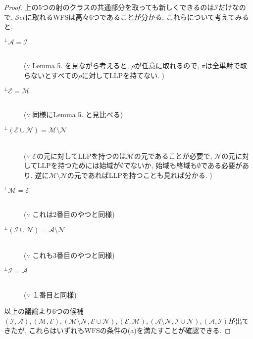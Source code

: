 \documentclass[. /main]{subfiles}
\theoremstyle{definition}
\begin{document}
\begin{proof}
上の5つの射のクラスの共通部分を取っても新しくできるのは$\mathcal{I}$だけなので, $\mathcal{S}et$に取れるWFSは高々6つであることが分かる. これらについて考えてみると, 
\begin{description}
\item [${}^{\perp}\mathcal{A}=\mathcal{I}$] \mbox{}\\
        ($\because$ Lemma 5. を見ながら考えると, $\rho$が任意に取れるので, $\pi$は全単射で取らないとすべての$\rho$に対してLLPを持てない. )
\item [${}^{\perp}\mathcal{E}=\mathcal{M}$]\mbox{}\\
        ($\because$ 同様にLemma 5. と見比べる)
\item [${}^{\perp}(\mathcal{E} \cup \mathcal{N})=\mathcal{M} \setminus \mathcal{N}$]\mbox{}\\
        ($\because$ $\mathcal{E}$の元に対してLLPを持つのは$\mathcal{M}$の元であることが必要で, $\mathcal{N}$の元に対してLLPを持つためには始域が$\emptyset$でないか, 始域も終域も$\emptyset$である必要があり, 逆に$\mathcal{M} \setminus \mathcal{N}$の元であればLLPを持つことも見れば分かる. )
\item [${}^{\perp}\mathcal{M}=\mathcal{E}$]\mbox{}\\
        ($\because$ これは2番目のやつと同様)
\item [${}^{\perp}(\mathcal{I} \cup \mathcal{N})=\mathcal{A} \setminus \mathcal{N}$]\mbox{}\\
        ($\because$ これも3番目のやつと同様)
\item [${}^{\perp}\mathcal{I}=\mathcal{A}$]\mbox{}\\
        ($\because$ １番目と同様)
\end{description}
以上の議論より6つの候補$(\mathcal{I},  \mathcal{A}),  (\mathcal{M},  \mathcal{E}),  (\mathcal{M} \setminus \mathcal{N},  \mathcal{E} \cup \mathcal{N}),  (\mathcal{E},  \mathcal{M}),  (\mathcal{A} \setminus \mathcal{N},  \mathcal{I} \cup \mathcal{N}),  (\mathcal{A},  \mathcal{I})$が出てきたが, これらはいずれもWFSの条件の(a)を満たすことが確認できる. 
\end{proof}
\end{document}
